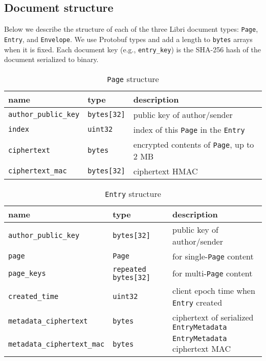 \documentclass[10pt]{article}
\newcommand{\ttt}[1]{\texttt{#1}}
\def\Entry{\ttt{Entry}}
\def\Page{\ttt{Page}}
\def\Envelope{\ttt{Envelope}}
\begin{document}
\pagebreak

\begin{appendices}

\section{Document structure}
\label{app:docs}

Below we describe the structure of each of the three Libri document types: \Page{}, \Entry{}, and \Envelope{}. We use Protobuf types and add a length to \ttt{bytes} arrays when it is fixed. Each document key (e.g., \ttt{entry\_key}) is the SHA-256 hash of the document serialized to binary.

\begin{table}[htbp]
	\caption*{\Page{} structure}
	\begin{small}
	\begin{tabular}{lll}
		\toprule
		name & type  & description \\ \midrule
		\ttt{author\_public\_key} & \ttt{bytes[32]} & public key of author/sender \\
		\ttt{index} & \ttt{uint32} & index of this \Page{} in the \Entry{} \\
		\ttt{ciphertext} & \ttt{bytes} & encrypted contents of \Page{}, up to 2 MB \\
		\ttt{ciphertext\_mac} & \ttt{bytes[32]} & ciphertext HMAC \\
		\bottomrule
	\end{tabular}
	\end{small}
\end{table}

\begin{table}[htbp]
	\caption*{\Entry{} structure}
	\begin{small}
	\begin{tabular}{lll}
		\toprule
		name & type  & description \\ \midrule
		\ttt{author\_public\_key} & \ttt{bytes[32]} & public key of author/sender \\
		\ttt{page} & \ttt{Page} & for single-\Page{} content \\
		\ttt{page\_keys} & \ttt{repeated bytes[32]} & for multi-\Page{} content \\
		\ttt{created\_time} & \ttt{uint32} & client epoch time when \Entry{} created \\
		\ttt{metadata\_ciphertext} & \ttt{bytes} & ciphertext of serialized \ttt{EntryMetadata} \\
		\ttt{metadata\_ciphertext\_mac} & \ttt{bytes} & \ttt{EntryMetadata} ciphertext MAC \\
		\bottomrule
	\end{tabular}
	\end{small}
\end{table}



\end{appendices}
\end{document}
